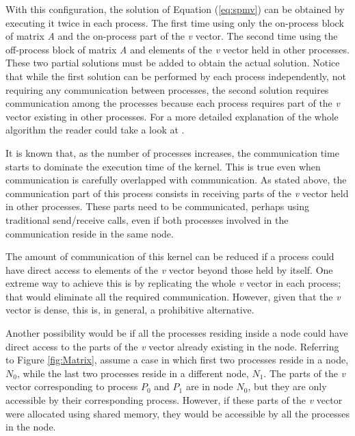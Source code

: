 With this configuration, the solution of Equation (\ref{eq:spmv}) can be obtained by executing it twice in each process. The first time using only the on-process block of matrix \emph{A} and the on-process part of the \emph{v} vector. The second time using the off-process block of matrix \emph{A} and elements of the \emph{v} vector held in other processes. These two partial solutions must be added to obtain the actual solution. Notice that while the first solution can be performed by each process independently, not requiring any communication between processes, the second solution requires communication among the processes because each process requires part of the \emph{v} vector existing in other processes. For a more detailed explanation of the whole algorithm the reader could take a look at \cite{BienzGO16}.

\medskip

It is known that, as the number of processes increases, the communication time starts to dominate the execution time of the kernel. This is true even when communication is carefully overlapped with communication. As stated above, the communication part of this process consists in receiving parts of the \emph{v} vector held in other processes. These parts need to be communicated, perhaps using traditional send/receive calls, even if both processes involved in the communication reside in the same node.

\medskip

The amount of communication of this kernel can be reduced if a process could have direct access to elements of the \emph{v} vector beyond those held by itself. One extreme way to achieve this is by replicating the whole \emph{v} vector in each process; that would eliminate all the required communication. However, given that the \emph{v} vector is dense, this is, in general, a prohibitive alternative. 

\medskip

Another possibility would be if all the processes residing inside a node could have direct access to the parts of the \emph{v} vector already existing in the node. Referring to Figure \ref{fig:Matrix}, assume a case in which first two processes reside in a node, $N_0$, while the last two processes reside in a different node, $N_1$. The parts of the \emph{v} vector corresponding to process $P_0$ and $P_1$ are in node $N_0$, but they are only accessible by their corresponding process. However, if these parts of the \emph{v} vector were allocated using shared memory, they would be accessible by all the processes in the node. 

